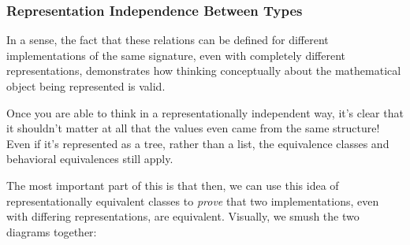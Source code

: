 \documentclass[aspectratio=169]{beamer}
\begin{document}
\begin{frame}[fragile]
  \frametitle{Representation Independence Between Types}

  In a sense, the fact that these relations can be defined for different
  implementations of the same signature, even with completely different
  representations, demonstrates how thinking conceptually about the
  mathematical object being represented is valid.

  \pause
  \vspace{\fill}

  Once you are able to think in a representationally independent way,
  it's clear that it shouldn't matter at all that the values even came from
  the same structure! Even if it's represented as a tree, rather than a
  list, the equivalence classes and behavioral equivalences still apply.

  \pause
  \vspace{\fill}

  The most important part of this is that then, we can use this idea of
  representationally equivalent classes to \textit{prove} that two
  implementations, even with differing representations, are equivalent.
  Visually, we smush the two diagrams together:
\end{frame}
\end{document}

